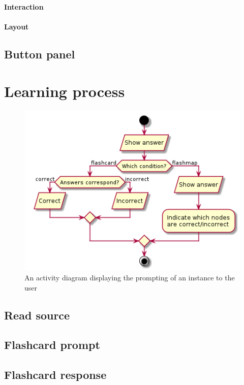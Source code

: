 \paragraph{Interaction}

\paragraph{Layout}

\subsection{Button panel}

\section{Learning process}

\begin{figure}
    \centering
    \includegraphics[width=.8\textwidth]{img/learningclient.png}
    \caption{An activity diagram displaying the prompting of an instance to the user}
    \label{fig:learningclient}
\end{figure}

\subsection{Read source}

\subsection{Flashcard prompt}

\subsection{Flashcard response}

